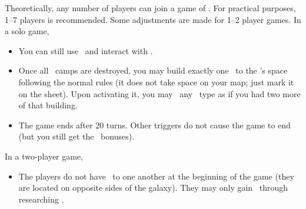 Theoretically, any number of players can join a game of \asciiplanets.  For practical purposes, 1–7 players is recommended.  Some adjustments are made for 1–2 player games.
\newline\newline
In a solo game,
\begin{itemize}
  \item You can still use \convoys\ and interact with \pirates.
  \item Once all \pirates\ camps are destroyed, you may build exactly one \battleship\ to the \pirate's space following the normal rules (it does not take space on your map; just mark it on the sheet).  Upon activating it, you may \activate\ any \fortification\ type as if you had two more of that building.
  \item The game ends after 20 turns. Other triggers do not cause the game to end (but you still get the \mastery\ bonuses).
\end{itemize}
In a two-player game,
\begin{itemize}
  \item The players do not have \reach\ to one
another at the beginning of the game (they are located on opposite sides of the galaxy). They may only gain \reach\ through researching \warpdrive.
\end{itemize}
